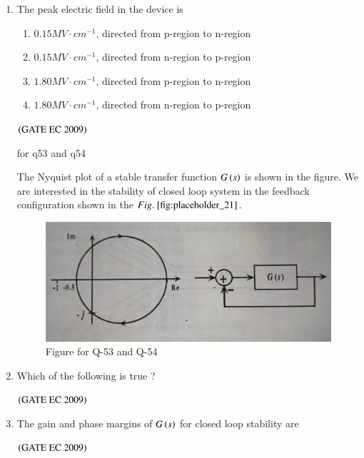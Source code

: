 \documentclass[journal,12pt,onecolumn]{IEEEtran}
\theoremstyle{remark}
\begin{document}
\begin{enumerate}[start=1, label={Q\arabic*.}]
\item The peak electric field in the device is
\begin{enumerate}
        \item $0.15 MV\cdot cm^{-1}$, directed from p-region to n-region
        \item $0.15 MV\cdot cm^{-1}$, directed from n-region to p-region
        \item $1.80  MV\cdot cm^{-1}$, directed from p-region to n-region
        \item $1.80 MV\cdot cm^{-1}$, directed from n-region to p-region
\end{enumerate}
\hfill $\left(\text{GATE EC 2009}\right)$

for q53 and q54

The Nyquist plot of a stable transfer function $G\left(s\right)$ is shown in the figure. We are interested in the stability of closed loop system in the feedback configuration shown in the $\figref{fig:placeholder_21}$. 
\begin{figure}[H]
    \centering
    \includegraphics[width=0.5\columnwidth]{figs/img_22.jpg}
    \caption{\centering Figure for Q-53 and Q-54}
    \label{fig:placeholder_21}
\end{figure}

\item Which of the following is true ?
\begin{enumerate}
\end{enumerate}
\hfill $\left(\text{GATE EC 2009}\right)$

\item The gain and phase margins of $G\left(s\right)$ for closed loop stability are
\begin{enumerate}
\end{enumerate}
\hfill $\left(\text{GATE EC 2009}\right)$


\end{enumerate}
\end{document}
